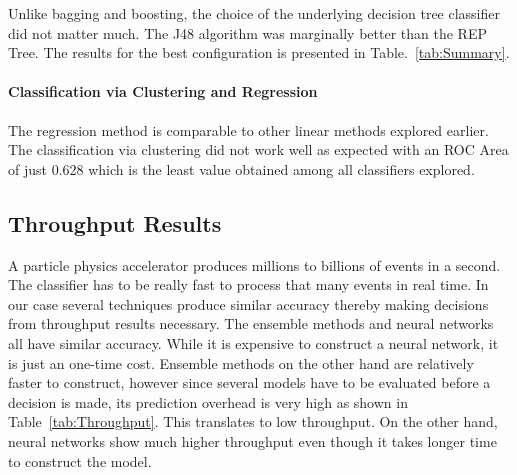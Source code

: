 Unlike bagging and boosting, the choice of the underlying decision tree classifier did not matter much. The J48 algorithm was marginally better than the REP Tree. The results for the best configuration is presented in Table.~\ref{tab:Summary}.

\paragraph{Classification via Clustering and Regression}
The regression method is comparable to other linear methods explored earlier. The classification via clustering did not work well as expected with an ROC Area of just 0.628 which is the least value obtained among all classifiers explored.


\subsection{Throughput Results}

A particle physics accelerator produces millions to billions of events in a second. The classifier has to be really fast to process that many events in real time. In our case several techniques produce similar accuracy thereby making decisions from throughput results necessary. The ensemble methods and neural networks all have similar accuracy. While it is expensive to construct a neural network, it is just an one-time cost. Ensemble methods on the other hand are relatively faster to construct, however since several models have to be evaluated before a decision is made, its prediction overhead is very high as shown in Table~\ref{tab:Throughput}. This translates to low throughput. On the other hand, neural networks show much higher throughput even though it takes longer time to construct the model.



